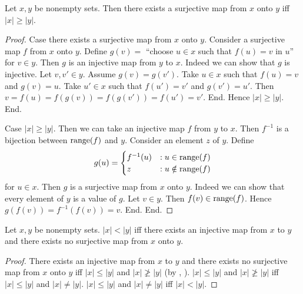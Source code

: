 \documentclass[10pt]{article}
\begin{document}
  \begin{forthel}
    \begin{proposition}[id=SET_THEORY_06_192336220913664,printid]
      Let $x, y$ be nonempty sets.
      Then there exists a surjective map from $x$ onto $y$ iff $|x| \geq |y|$.
    \end{proposition}
    \begin{proof}
      Case there exists a surjective map from $x$ onto $y$.
        Consider a surjective map $f$ from $x$ onto $y$.
        Define $g(v) =$ ``choose $u \in x$ such that $f(u) = v$ in $u$'' for $v \in y$.
        Then $g$ is an injective map from $y$ to $x$.
        Indeed we can show that $g$ is injective.
          Let $v, v' \in y$.
          Assume $g(v) = g(v')$.
          Take $u \in x$ such that $f(u) = v$ and $g(v) = u$.
          Take $u' \in x$ such that $f(u') = v'$ and $g(v') = u'$.
          Then $v
            = f(u)
            = f(g(v))
            = f(g(v'))
            = f(u')
            = v'$.
        End.
        Hence $|x| \geq |y|$.
      End.

      Case $|x| \geq |y|$.
        Then we can take an injective map $f$ from $y$ to $x$.
        Then $f^{-1}$ is a bijection between $\textrm{range}(f)$ and $y$.
        Consider an element $z$ of $y$.
        Define \[ g(u) =
          \begin{cases}
            f^{-1}(u) & : u \in \textrm{range}(f) \\
            z         & : u \notin \textrm{range}(f)
          \end{cases} \]
        for $u \in x$.
        Then $g$ is a surjective map from $x$ onto $y$.
        Indeed we can show that every element of $y$ is a value of $g$.
          Let $v \in y$.
          Then $f(v) \in \textrm{range}(f)$.
          Hence $g(f(v)) = f^{-1}(f(v)) = v$.
        End.
      End.
    \end{proof}
  \end{forthel}

  \begin{forthel}
    \begin{proposition}[id=SET_THEORY_06_5843717288099840,printid]
      Let $x, y$ be nonempty sets.
      $|x| < |y|$ iff there exists an injective map from $x$ to $y$ and there exists no surjective map from $x$ onto $y$.
    \end{proposition}
    \begin{proof}
      There exists an injective map from $x$ to $y$ and there exists no surjective map from $x$ onto $y$ iff $|x| \leq |y|$ and $|x| \ngeq |y|$ (by , ).
      $|x| \leq |y|$ and $|x| \ngeq |y|$ iff $|x| \leq |y|$ and $|x| \neq |y|$.
      $|x| \leq |y|$ and $|x| \neq |y|$ iff $|x| < |y|$.
    \end{proof}
  \end{forthel}
\end{document}
